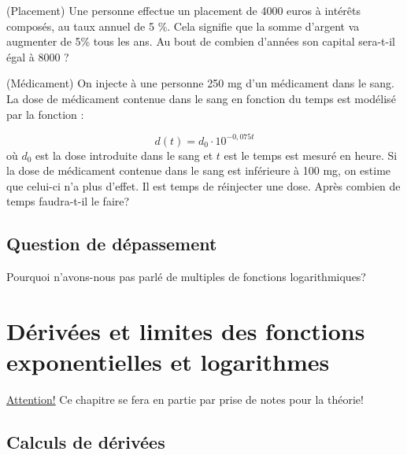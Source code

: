 \documentclass[a4paper,12pt,singlepage]{report}
\begin{document}
\begin{exercice}
(Placement) Une personne effectue un placement de 4000 euros à intérêts
composés, au taux annuel de 5 \%. Cela signifie que la somme
d’argent va augmenter de 5\% tous les ans.
Au bout de combien d’années son capital sera-t-il égal à 8000\texteuro{} ?
\end{exercice}

\begin{exercice}
(Médicament) On injecte à une personne 250 mg d’un médicament dans le sang.
La dose de médicament contenue dans le sang en fonction du temps est modélisé par
la fonction :

\[
d(t)=d_0\cdot 10^{-0,075t}
\]
où \(d_0\) est la dose introduite dans le sang et \(t\) est le temps est mesuré en heure.
Si la dose de médicament contenue dans le sang est inférieure à 100 mg, on estime
que celui-ci n’a plus d’effet. Il est temps de réinjecter une dose. Après combien de
temps faudra-t-il le faire?
\end{exercice}

\section{Question de dépassement}
\label{sec:org533a9a1}

\begin{question}
Pourquoi n'avons-nous pas parlé de multiples de fonctions logarithmiques?
\end{question}
\chapter{Dérivées et limites des fonctions exponentielles et logarithmes}
\label{sec:org3b19d65}
\uline{Attention!} Ce chapitre se fera en partie par prise de notes pour la théorie!

\section{Calculs de dérivées}
\label{sec:org761211b}
\end{document}
